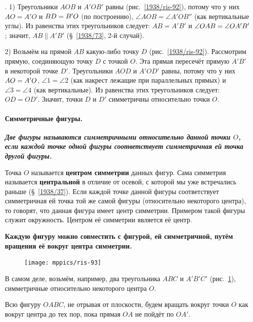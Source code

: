 \documentclass[twoside]{book}
\makeatletter
\newcommand{\rindex}[2][\imki@jobname]{%
  \index[#1]{\detokenize{#2}}%
}
\makeatother
\begin{document}
\smallskip
\mbox{.}
1) Треугольники $AOB$ и $A'OB'$ равны (рис.~\ref{1938/ris-92}), потому что у них $AO=A'O$ и $BD\z=B'O$ (по построению), $\angle AOB=\angle A'OB''$ (как вертикальные углы).
Из равенства этих треугольников следует:
$AB=A'B'$ и $\angle OAB \z= \angle OA'B'$;
значит, $AB\parallel A'B'$ (§~\ref{1938/73}, 2-й случай).

2) Возьмём на прямой $AB$ какую-либо точку $D$ (рис.~\ref{1938/ris-92}).
Рассмотрим прямую, соединяющую точку $D$ с точкой $O$.
Эта прямая пересечёт прямую $A'B'$ в некоторой точке $D'$.
Треугольники $AOD$ и $A'OD'$ равны, потому что у них $AO\z=A'O$, $\angle 1 = \angle 2$ (как накрест лежащие при параллельных прямых) и $\angle 3 = \angle 4$ (как вертикальные).
Из равенства этих треугольников следует:
$OD = OD'$.
Значит, точки $D$ и $D'$ симметричны относительно точки $O$.


\paragraph{Симметричные фигуры.}\label{1938/86}
\textbf{\emph{Две фигуры называются симметричными относительно данной точки $O$, если каждой точке одной фигуры соответствует симметричная ей точка другой фигуры.}} 

Точка $O$ называется \rindex{центр симметрии}\textbf{центром симметрии} данных фигур.
Сама симметрия называется \rindex{центральная симметрия}\textbf{центральной} в отличие от осевой, с которой мы уже встречались раньше (§~\ref{1938/37}).
Если каждой точке данной фигуры соответствует симметричная ей точка той же самой фигуры (относительно некоторого центра), то говорят, что данная фигура имеет центр симметрии.
Примером такой фигуры служит окружность.
Центром её симметрии является её центр.

\textbf{Каждую фигуру можно совместить с фигурой, ей симметричной, путём вращения её вокруг центра симметрии.}

\begin{figure}
\centering
\texttt{[image: mppics/ris-93]}
\caption{}\label{1938/ris-93}
\end{figure}

В самом деле, возьмём, например, два треугольника $ABC$ и $A'B'C'$ (рис.~\ref{1938/ris-93}), симметричные относительно некоторого центра $O$.

Всю фигуру $OABC$, не отрывая от плоскости, будем вращать вокруг точки $O$ как вокруг центра до тех пор, пока прямая $OA$ не пойдёт по $OA'$.
\end{document}
